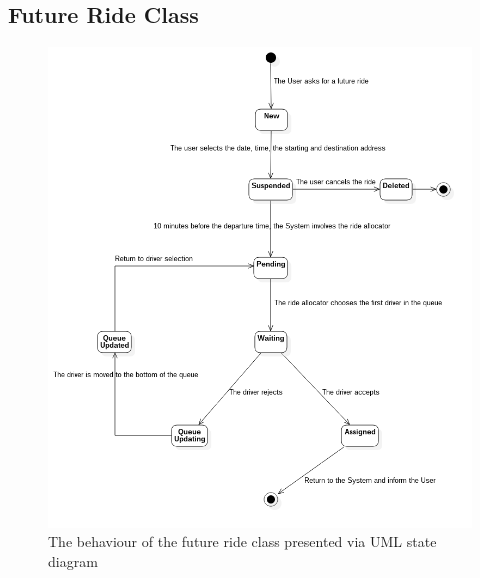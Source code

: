 \clearpage
\subsection{Future Ride Class}
\begin{figure}[h!]
	\centerline{\includegraphics[width=\textwidth]{./figures/Statechart_FutureRideClass.png}}
	\caption{The behaviour of the \Gls{future} ride class presented via UML state diagram}
\end{figure}

\acresetall